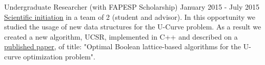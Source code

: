 \documentclass[11pt, a4paper]{awesome-cv-res}
\begin{document}
\begin{cventries}
\cventry
{Undergraduate Researcher (with FAPESP Scholarship)}
{}
{}
{January 2015 - July 2015}
{\href{https://bv.fapesp.br/en/bolsas/156441/studies-of-efficient-data-structures-to-tackle-the-u-curve-optimization-problem/}
{\color{awesome} \underline{Scientific initiation}} in a team of 2 
    (student and advisor). In this opportunity we studied the usage of 
    new  data structures for the U-Curve problem. As a result we created
    a  new algorithm, UCSR, implemented in C++ and described on a 
    \href{https://www.sciencedirect.com/science/article/pii/S0020025518306789?via\%3Dihub}
    {\color{awesome}\underline{published paper}}, of title: "Optimal
    Boolean lattice-based algorithms for the U-curve optimization 
    problem".
}

\end{cventries}


\end{document}
